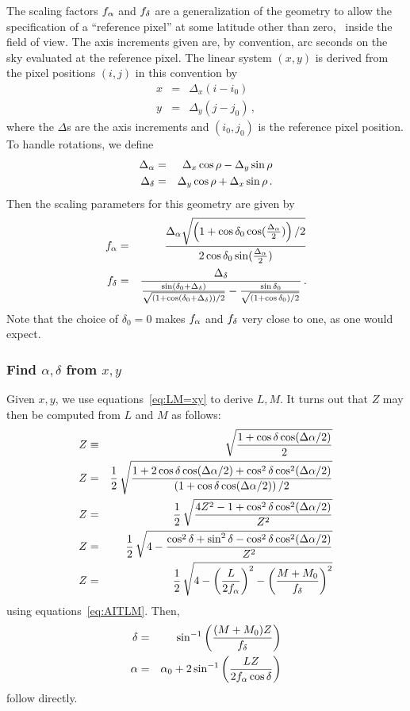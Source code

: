 The scaling factors $f_{\alpha}$ and $f_{\delta}$ are a generalization of the
geometry to allow the specification of a ``reference pixel'' at some
latitude other than zero, \ie\ inside the field of view.  The
axis increments given are, by convention, arc seconds on the sky
evaluated at the reference pixel.  The linear system $(x,y)$ is
derived from the pixel positions $(i,j)$ in this convention by
\begin{eqnarray*}
   x & = & \Delta_x (i-i_0) \\
   y & = & \Delta_y (j-j_0) \, ,
\end{eqnarray*}
where the $\Delta$s are the axis increments and $(i_0,j_0)$ is the
reference pixel position.  To handle rotations, we define
\begin{eqnarray*}
   \Delta_{\alpha} & = & \Delta_x\cos\rho - \Delta_y\sin\rho \\
   \Delta_{\delta} & = & \Delta_y\cos\rho + \Delta_x\sin\rho \, .
\end{eqnarray*}
Then the scaling parameters for this geometry are given by
\begin{eqnarray*}
   \fa & = &\frac{\Da\sqrt{\left(1+\cos\delta_0\cos({
                 \mathstrut\Da\over2}) \right)/2}}{2\cos\delta_0
                  \sin({\mathstrut\Da\over2})} \\
     \noalign{\vskip 1pt}
   \fd & = &\frac{\Dd}{\frac{\sin(\delta_0+\Dd)}{\mathstrut
               \sqrt{\left(1+\cos(\delta_0+\Dd)\right)/2}} -
               \frac{\mathstrut\sin\delta_0}{\mathstrut\sqrt{(1+
                  \cos\delta_0)/2}}} \, .
\end{eqnarray*}
Note that the choice of $\delta_0 = 0$ makes $f_{\alpha}$ and $f_{\delta}$ very
close to one, as one would expect.

\subsubsection{Find $\alpha,\delta$ from $x,y$}

  Given $x,y$, we use equations~\ref{eq:LM=xy} to derive $L,M$.  It
turns out that $Z$ may then be computed from $L$ and $M$ as follows:
\begin{eqnarray*}
   Z & \equiv &\sqrt{\frac{1 + \cos\delta\cos(\Delta\alpha/2)}{2}} \\
   Z & = &\frac{1}{2}\,\sqrt{\frac{1+2\cos\delta\cos(\Delta\alpha/2) +
              \cos^2\delta\cos^2(\Delta\alpha/2) }{\left(1+\cos\delta\cos
              (\Delta\alpha/2)\right)/2}} \\
   Z & = &\frac{1}{2}\,\sqrt{\frac{4Z^2-1+\cos^2\delta\cos^2(\Delta\alpha/2)
              }{Z^2}} \\
   Z & = &\frac{1}{2}\,\sqrt{4-\frac{\cos^2\delta+\sin^2\delta -
              \cos^2\delta\cos^2(\Delta\alpha/2)}{Z^2}} \\
   Z & = &\frac{1}{2}\,\sqrt{4-\left(\frac{L}{2f_{\alpha}}\right)^2
              - \left(\frac{M+M_0}{f_{\delta}}\right)^2}
\end{eqnarray*}
using equations~\ref{eq:AITLM}.  Then,
\begin{eqnarray}
   \delta & = & \sin^{-1}\left({(M+M_0)Z\over f_{\delta}}\right) \\
   \alpha & = &\alpha_0 + 2\sin^{-1}\left(\frac{LZ}{2f_{\alpha}\cos\delta}
                   \right)
\end{eqnarray}
follow directly.
\label{sec:Bii}


